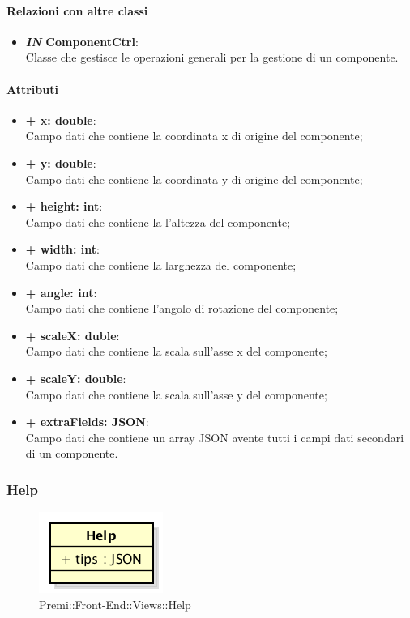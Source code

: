 	\paragraph{Relazioni con altre classi}
	\begin{itemize}
		\item \textbf{\textit{IN} ComponentCtrl}:\\
		Classe che gestisce le operazioni generali per la gestione di un componente.
	\end{itemize}
	
	\paragraph{Attributi}
	\begin{itemize}
		\item \textbf{+ x: double}:\\
			Campo dati che contiene la coordinata x di origine del componente;
		\item \textbf{+ y: double}:\\
			Campo dati che contiene la coordinata y di origine del componente;
		\item \textbf{+ height: int}:\\
			Campo dati che contiene la l'altezza del componente;
		\item \textbf{+ width: int}:\\
			Campo dati che contiene la larghezza del componente;
		\item \textbf{+ angle: int}:\\
			Campo dati che contiene l'angolo di rotazione del componente;
		\item \textbf{+ scaleX: duble}:\\
			Campo dati che contiene la scala sull'asse x del componente;
		\item \textbf{+ scaleY: double}:\\
			Campo dati che contiene la scala sull'asse y del componente;
		\item \textbf{+ extraFields: JSON}:\\
			Campo dati che contiene un array JSON avente tutti i campi dati secondari di un componente.
	\end{itemize}
	

\subsubsection{Help}
	\begin{figure}[h]
		\centering
		\includegraphics[width=0.3\linewidth]{img/premi_front_end_views_help}
		\caption[Premi::Front-End::Views::Help]{Premi::Front-End::Views::Help}
	\end{figure}
	
